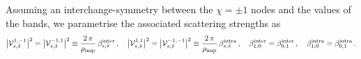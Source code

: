 \documentclass[aps,prb,onecolumn,nofootinbib,citeautoscript,10pt]{revtex4-2}
\begin{document}
Assuming an interchange-symmetry between the $\chi = \pm 1$ nodes and the values of the bands, we parametrise the associated scattering strengths as
\begin{align}
 \big |{\mathcal V} ^{1, -1}_{ s, \tilde s} \big |^2 =   \big |{\mathcal V} ^{ -1, 1}_{ s, \tilde s} \big|^2
 \equiv \frac{ 2\,\pi} {\rho_{\rm imp}}\, \beta^{\rm inter}_{s, \tilde s} \,,
 \quad  \big |{\mathcal V} ^{1, 1}_{ s, \tilde s} \big |^2  
 =  \big | {\mathcal V} ^{-1,- 1}_{ s, \tilde s} \big|^2
  \equiv  \frac{ 2\,\pi} {\rho_{\rm imp}} \, \beta^{\rm intra}_{s, \tilde s} \,,\quad
\beta^{\rm inter}_{1,0} =  \beta^{\rm inter}_{0,1} \,, \quad
\beta^{\rm intra}_{1,0} =  \beta^{\rm intra}_{0,1} \,.
\end{align} 
\end{document}
